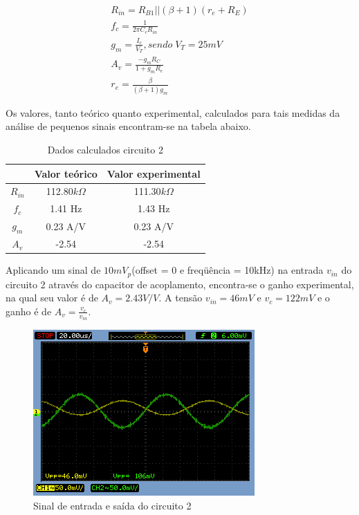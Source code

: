 \documentclass[a4paper]{article} %
\begin{document}
\begin{eqnarray}
R_{in}=R_{B1}||(\beta+1)(r_{e}+R_E)\\
f_c=\frac{1}{2\pi C_cR_{in}}\\
g_m=\frac{I_c}{V_T},sendo \; V_T = 25 mV\\
A_v=\frac{-g_mR_C}{1+g_mR_e}\\
r_{e}=\frac{\beta}{(\beta+1)g_m}
\end{eqnarray}

Os valores, tanto teórico quanto experimental, calculados para tais medidas da análise
de pequenos sinais encontram-se na tabela abaixo.

\begin{table}[h!]
\begin{centering}
\begin{tabular}{ccc}
\hline 
 & Valor teórico & Valor experimental\tabularnewline
\hline
\hline 
$R_{in}$ & 112.80$k\Omega$ & 111.30$k\Omega$\tabularnewline
$f_{c}$ & 1.41 Hz & 1.43 Hz\tabularnewline
$g_{m}$ & 0.23 A/V & 0.23 A/V\tabularnewline
$A_{v}$ & -2.54 & -2.54\tabularnewline
\hline
\end{tabular}
\par\end{centering}

\caption{Dados calculados circuito 2}

\end{table}
%
Aplicando um sinal de $10mV_p$(offset = 0 e freqüência = 10kHz) na entrada $v_{in}$
do circuito 2 através do capacitor de acoplamento, encontra-se o ganho experimental, na qual seu
valor é de $A_v=2.43V/V$. A tensão $v_{in}=46mV$ e $v_c=122mV$ e o ganho é de  $A_v=\frac{v_c}{v_{in}}$.


\begin{figure}[h!]
\begin{centering}
\includegraphics[scale=0.5]{figuras03/3} \caption{Sinal de entrada e saída do circuito 2 \label{fig:3}}
\par\end{centering}
\end{figure}
\end{document}
